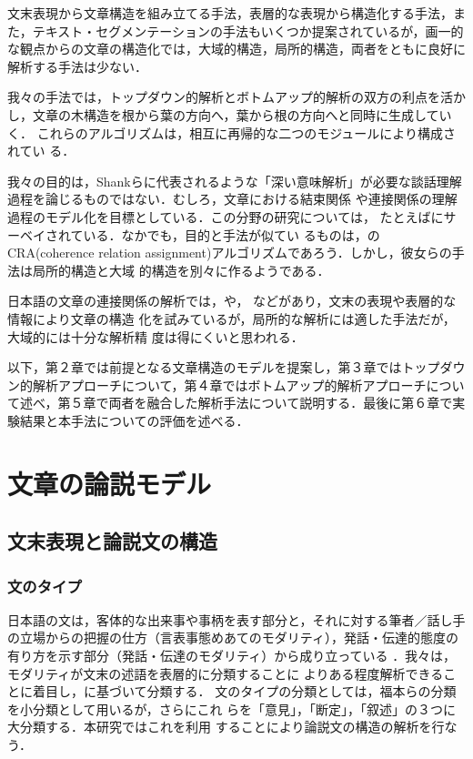 文末表現から文章構造を組み立てる手法，表層的な表現から構造化する手法，ま
た，テキスト・セグメンテーションの手法もいくつか提案されているが，画一的
な観点からの文章の構造化では，大域的構造，局所的構造，両者をともに良好に
解析する手法は少ない．

我々の手法では，トップダウン的解析とボトムアップ的解析の双方の利点を活か
し，文章の木構造を根から葉の方向へ，葉から根の方向へと同時に生成していく．
これらのアルゴリズムは，相互に再帰的な二つのモジュールにより構成されてい
る．

我々の目的は，Shankらに代表されるような「深い意味解析」が必要な談話理解
過程を論じるものではない．むしろ，文章における結束関係\cite{Halliday:76}
や連接関係の理解過程のモデル化を目標としている．この分野の研究については，
たとえば\cite{Abe:94}にサーベイされている．なかでも，目的と手法が似てい
るものは，\cite{Dahlgren:88,Dahlgren:89}のCRA(coherence relation
assignment)アルゴリズムであろう．しかし，彼女らの手法は局所的構造と大域
的構造を別々に作るようである．

日本語の文章の連接関係の解析では，\cite{Fukumoto:91,Fukumoto:92}や，
\cite{Kurohashi:94}などがあり，文末の表現や表層的な情報により文章の構造
化を試みているが，局所的な解析には適した手法だが，大域的には十分な解析精
度は得にくいと思われる．

以下，第２章では前提となる文章構造のモデルを提案し，第３章ではトップダウ
ン的解析アプローチについて，第４章ではボトムアップ的解析アプローチについ
て述べ，第５章で両者を融合した解析手法について説明する．最後に第６章で実
験結果と本手法についての評価を述べる．

\section{文章の論説モデル}

\subsection{文末表現と論説文の構造}

\subsubsection{文のタイプ}

日本語の文は，客体的な出来事や事柄を表す部分と，それに対する筆者／話し手
の立場からの把握の仕方（言表事態めあてのモダリティ），発話・伝達的態度の
有り方を示す部分（発話・伝達のモダリティ）から成り立っている
\cite{Nitta:91}．我々は，モダリティが文末の述語を表層的に分類することに
よりある程度解析できることに着目し，\cite{Fukumoto:91}に基づいて分類する．
文のタイプの分類としては，福本らの分類を小分類として用いるが，さらにこれ
らを「意見」，「断定」，「叙述」の３つに大分類する．本研究ではこれを利用
することにより論説文の構造の解析を行なう．

